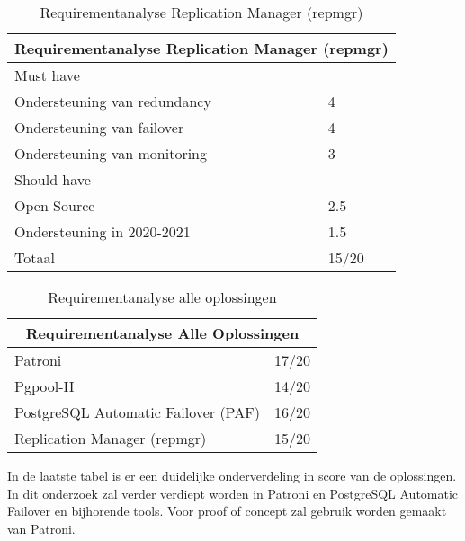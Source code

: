\begin{table}[!h]
\begin{tabular}{ |p{6cm}||p{6cm}|  }
    \hline
    \multicolumn{2}{|c|}{Requirementanalyse Replication Manager (repmgr)} \\
    \hline
    Must have & \\
    \hline
    Ondersteuning van redundancy  & 4 \\
    Ondersteuning van failover &  4 \\
    Ondersteuning van monitoring & 3 \\
    \hline
    Should have & \\
    \hline
    Open Source &  2.5 \\
    Ondersteuning in 2020-2021 & 1.5 \\
    \hline
    \hline
    Totaal & 15/20 \\
    \hline
\end{tabular}
\caption{Requirementanalyse Replication Manager (repmgr)}
\label{table:Requirementanalyse Replication Manager (repmgr)}
\end{table}


\begin{table}[!h]
\begin{tabular}{ |p{6cm}||p{6cm}|  }
    \hline
    \multicolumn{2}{|c|}{Requirementanalyse Alle Oplossingen} \\
    \hline
    Patroni & 17/20 \\
    \hline
    Pgpool-II & 14/20 \\
    \hline
    PostgreSQL Automatic Failover (PAF) & 16/20 \\
    \hline
    Replication Manager (repmgr) & 15/20 \\
    \hline
\end{tabular}
\caption{Requirementanalyse alle oplossingen}
\label{table:Requirementanalyse alle oplossingen}
In de laatste tabel is er een duidelijke onderverdeling in score van de oplossingen. In dit onderzoek zal verder verdiept worden in Patroni en PostgreSQL Automatic Failover en bijhorende tools. Voor proof of concept zal gebruik worden gemaakt van Patroni.
\end{table}

